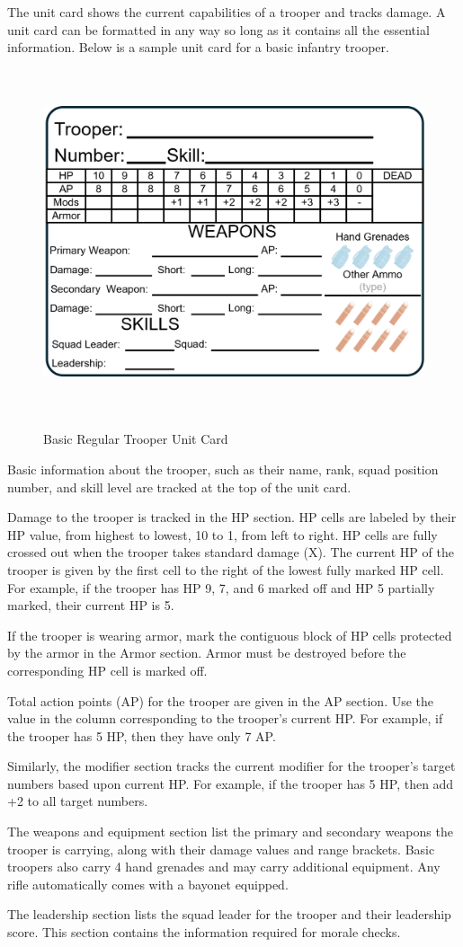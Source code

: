 The unit card shows the current capabilities of a trooper and tracks damage.
A unit card can be formatted in any way so long as it contains all the essential information.
Below is a sample unit card for a basic infantry trooper.

\begin{figure}[H]
  \centering
  \includegraphics[alt='Sample Regular Trooper', width=5.63in, height=4in]{img/RegularTrooper.png}
  \caption*{Basic Regular Trooper Unit Card}
\end{figure}

Basic information about the trooper, such as their name, rank, squad position number, and skill level are tracked at the top of the unit card.

Damage to the trooper is tracked in the HP section.
HP cells are labeled by their HP value, from highest to lowest, 10 to 1, from left to right.
HP cells are fully crossed out when the trooper takes standard damage (X).
The current HP of the trooper is given by the first cell to the right of the lowest fully marked HP cell.
For example, if the trooper has HP 9, 7, and 6 marked off and HP 5 partially marked, their current HP is 5.

If the trooper is wearing armor, mark the contiguous block of HP cells protected by the armor in the Armor section.
Armor must be destroyed before the corresponding HP cell is marked off.

Total action points (AP) for the trooper are given in the AP section.
Use the value in the column corresponding to the trooper's current HP.
For example, if the trooper has 5 HP, then they have only 7 AP.

Similarly, the modifier section tracks the current modifier for the trooper's target numbers based upon current HP.
For example, if the trooper has 5 HP, then add +2 to all target numbers.

The weapons and equipment section list the primary and secondary weapons the trooper is carrying, along with their damage values and range brackets.
Basic troopers also carry 4 hand grenades and may carry additional equipment.
Any rifle automatically comes with a bayonet equipped.

The leadership section lists the squad leader for the trooper and their leadership score.
This section contains the information required for morale checks.
